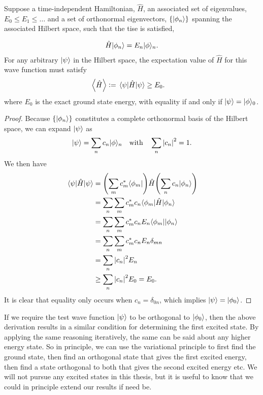 \documentclass[Thesis.tex]{subfiles}
\begin{document}
\begin{theorem}\label{thm:variational-principle}
    Suppose a time-independent Hamiltonian, $\hat H$, an associated set of eigenvalues,
    $E_0\leq E_1\leq\dots$ and
    a set of orthonormal eigenvectors, $\{| \phi_n \rangle\}$ spanning the associated
    Hilbert space, such that the \gls{tise} is satisfied,

    \begin{align}
        \hat H| \phi_n \rangle = E_n| \phi \rangle_n.
    \end{align}
    For any arbitrary $| \psi \rangle$ in the Hilbert space, the expectation value of $\hat H$
    for this wave function must satisfy
    \begin{align}
        \expval{\hat H}&\vcentcolon= \expval{\hat H}{\psi} \geq E_0.
    \end{align}
    where $E_0$ is the exact ground state energy, with equality if and only if
    $| \psi \rangle=| \phi \rangle_0$.
\end{theorem}
\begin{proof}
    Because $\{| \phi_n \rangle\}$ constitutes a complete orthonormal basis of the Hilbert
    space, we can expand $| \psi \rangle$ as
    \begin{align}
        \ket\psi = \sum_n c_n\ket\phi_n \qq{with} \sum_n \abs{c_n}^2 = 1.
    \end{align}
    We then have
    \begin{align}
        \expval{\hat H}{\psi} &= \qty(\sum_m c^*_m\langle \phi_m |)\hat H\qty(\sum_n
        c_n| \phi_n \rangle)\\
        &= \sum_n\sum_m c_m^*c_n\langle \phi_m |\hat H| \phi_n \rangle\\
        &= \sum_n\sum_m c_m^*c_nE_n\langle \phi_m || \phi_n \rangle\\
        &= \sum_n\sum_m c_m^*c_nE_n\delta_{mn}\\
        &= \sum_n \abs{c_n}^2 E_n\\
        &\geq\sum_n \abs{c_n}^2 E_0 = E_0.
    \end{align}
    It is clear that equality only occurs when $c_n = \delta_{0n}$, which implies
    $| \psi \rangle=| \phi_0 \rangle$.
\end{proof}

If we require the test wave function $| \psi \rangle$ to be orthogonal to $| \phi_0 \rangle$, then
the above derivation results in a similar condition for determining the first excited
state. By applying the same reasoning iteratively, the same can be said about any higher
energy state. So in principle, we can use the variational principle to first find the
ground state, then find an orthogonal state that gives the first excited energy, then find
a state orthogonal to both that gives the second excited energy etc. We will not pursue
any excited states in this thesis, but it is useful to know that we could in principle
extend our results if need be.
\end{document}
